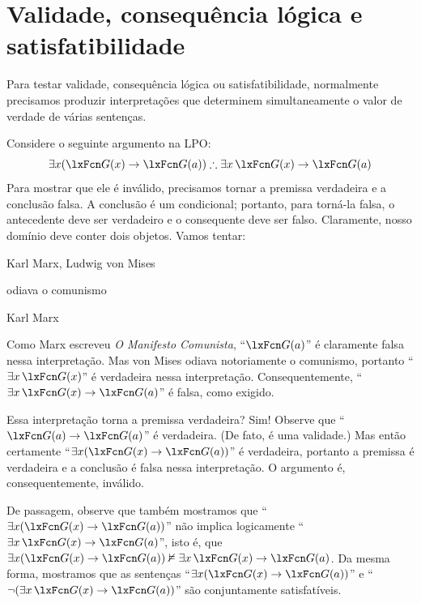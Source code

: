\section{Validade, consequência lógica e satisfatibilidade}
Para testar validade, consequência lógica ou satisfatibilidade, normalmente precisamos produzir interpretações que determinem simultaneamente o valor de verdade de várias sentenças.

Considere o seguinte argumento na LPO:
$$\exists x(\atom{G}{x} \eif \atom{G}{a}) \therefore \exists x\, \atom{G}{x} \eif \atom{G}{a}$$
Para mostrar que ele é inválido, precisamos tornar a premissa verdadeira e a conclusão falsa. A conclusão é um condicional; portanto, para torná-la falsa, o antecedente deve ser verdadeiro e o consequente deve ser falso. Claramente, nosso domínio deve conter dois objetos. Vamos tentar:
	\begin{ekey}
\item[\text{domínio}] Karl Marx, Ludwig von Mises
\item[\atom{G}{x}]  odiava o comunismo
		\item[a] Karl Marx
	\end{ekey}
Como Marx escreveu \emph{O Manifesto Comunista}, \textquotedblleft $\atom{G}{a}$\textquotedblright{} é claramente falsa nessa interpretação. Mas von Mises odiava notoriamente o comunismo, portanto \textquotedblleft $\exists x\, \atom{G}{x}$\textquotedblright{} é verdadeira nessa interpretação. Consequentemente, \textquotedblleft $\exists x\, \atom{G}{x} \eif \atom{G}{a}$\textquotedblright{} é falsa, como exigido.

Essa interpretação torna a premissa verdadeira? Sim! Observe que \textquotedblleft $\atom{G}{a} \eif \atom{G}{a}$\textquotedblright{} é verdadeira. (De fato, é uma validade.) Mas então certamente \textquotedblleft $\exists x (\atom{G}{x} \eif \atom{G}{a})$\textquotedblright{} é verdadeira, portanto a premissa é verdadeira e a conclusão é falsa nessa interpretação. O argumento é, consequentemente, inválido.

De passagem, observe que também mostramos que \textquotedblleft $\exists x(\atom{G}{x} \eif \atom{G}{a})$\textquotedblright{} não implica logicamente \textquotedblleft $\exists x\, \atom{G}{x} \eif \atom{G}{a}$\textquotedblright{}, isto é, que $\exists x (\atom{G}{x} \eif \atom{G}{a}) \nentails \exists x\, \atom{G}{x} \eif \atom{G}{a}$. Da mesma forma, mostramos que as sentenças \textquotedblleft $\exists x (\atom{G}{x} \eif \atom{G}{a})$\textquotedblright{} e \textquotedblleft $\enot (\exists x\, \atom{G}{x} \eif \atom{G}{a})$\textquotedblright{} são conjuntamente satisfatíveis.

